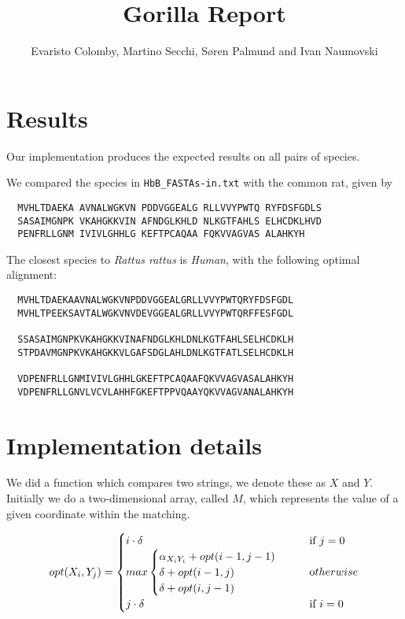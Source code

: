 \documentclass{tufte-handout}
\title{Gorilla Report}
\author{Evaristo Colomby, Martino Secchi, Søren Palmund and Ivan Naumovski}
\begin{document}
  \maketitle

  \section{Results}

  Our implementation produces the expected results on all pairs of species.

  We compared the species in \verb!HbB_FASTAs-in.txt!
  with the common rat, given by

  \begin{verbatim}
  MVHLTDAEKA AVNALWGKVN PDDVGGEALG RLLVVYPWTQ RYFDSFGDLS
  SASAIMGNPK VKAHGKKVIN AFNDGLKHLD NLKGTFAHLS ELHCDKLHVD
  PENFRLLGNM IVIVLGHHLG KEFTPCAQAA FQKVVAGVAS ALAHKYH
  \end{verbatim}


  The closest species to \emph{Rattus rattus} is  \emph{Human}, with the following optimal alignment:

\medskip
  \begin{fullwidth}\small
  \begin{verbatim}
  MVHLTDAEKAAVNALWGKVNPDDVGGEALGRLLVVYPWTQRYFDSFGDL
  MVHLTPEEKSAVTALWGKVNVDEVGGEALGRLLVVYPWTQRFFESFGDL

  SSASAIMGNPKVKAHGKKVINAFNDGLKHLDNLKGTFAHLSELHCDKLH
  STPDAVMGNPKVKAHGKKVLGAFSDGLAHLDNLKGTFATLSELHCDKLH

  VDPENFRLLGNMIVIVLGHHLGKEFTPCAQAAFQKVVAGVASALAHKYH
  VDPENFRLLGNVLVCVLAHHFGKEFTPPVQAAYQKVVAGVANALAHKYH
  \end{verbatim}
\end{fullwidth}



  \section{Implementation details}
We did a function which compares two strings, we denote these as $X$ and  $Y$.
Initially we do a two-dimensional array, called $M$, which represents the value of a given coordinate within the matching.

\begin{equation}
    opt(X_i, Y_j) =
    \begin{cases}
    	i\cdot\delta       			& \quad \text{if } j = 0\\
        max 	\begin{cases}
        \alpha_{X_i Y_i} + opt(i-1, j-1)\\
        \delta + opt(i-1, j)\\
        \delta + opt(i, j-1)\\
\end{cases}				& \quad \text otherwise \\
        j\cdot\delta	& \quad \text{if } i = 0  \\
    \end{cases}
\end{equation}\newline
\end{document}
